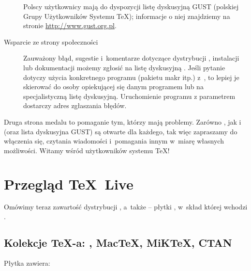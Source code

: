 \documentclass{article}
\begin{document}
\begin{description}
Polscy użytkownicy mają do dyspozycji listę dyskusyjną GUST (polskiej Grupy
Użytkowników Systemu \TeX); informacje o niej
znajdziemy na stronie \url{http://www.gust.org.pl}.

\item [Wsparcie ze strony społeczności \TL{}] Zauważony błąd, sugestie i~komentarze dotyczące dystrybucji \TL{}, instalacji
lub dokumentacji możemy zgłosić na listę dyskusyjną . Jeśli pytanie dotyczy użycia konkretnego programu
(pakietu makr itp.) z~\TL{}, to lepiej je  skierować   do osoby
opiekującej się danym programem lub na specjalistyczną listę dyskusyjną. Uruchomienie programu z parametrem   dostarczy adres  zgłaszania błędów.
\end{description}

Druga strona medalu to pomaganie tym, którzy mają problemy. Zarówno
, jak i~ (oraz lista dyskusyjna GUST)
są otwarte dla każdego,
tak więc zapraszamy do włączenia się, czytania wiadomości i~pomagania
innym w~miarę własnych możliwości. Witamy wśród użytkowników
systemu \TeX!

\section{Przegląd \protect\TeX\protect\ Live}
\label{sec:overview-tl}

Omówimy teraz zawartość dystrybucji \TL{}, a~także \TK{} --
płytki \DVD, w~skład której wchodzi \TL.


\subsection{Kolekcje \protect\TeX-a: \protect\TL, Mac\protect\TeX, MiK\protect\TeX, CTAN}
\label{sec:tl-coll-dists}
Płytka \DVD{} \TK{}  zawiera:
\end{document}
